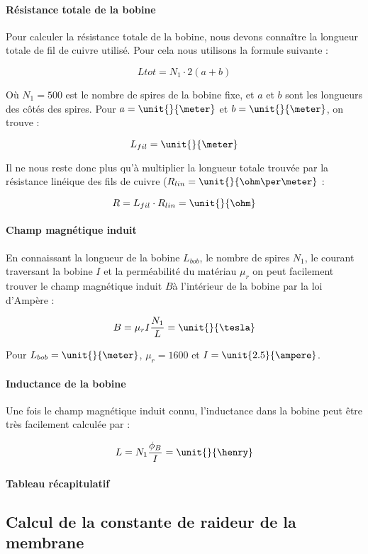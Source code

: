 \paragraph{Résistance totale de la bobine}
Pour calculer la résistance totale de la bobine, nous devons connaître la longueur totale de fil de cuivre utilisé.
Pour cela nous utilisons la formule suivante :

$$L{tot} = N_1 \cdot 2(a + b)$$

Où $N_1 = 500$ est le nombre de spires de la bobine fixe, et $a$ et $b$ sont les longueurs des côtés des spires. Pour
$a = \unit{}{\meter}$ et $b = \unit{}{\meter}$, on trouve :

$$L_{fil} = \unit{}{\meter}$$

Il ne nous reste donc plus qu'à multiplier la longueur totale trouvée par la résistance linéique des fils de cuivre
($R_{lin} = \unit{}{\ohm\per\meter}$ :

$$R = L_{fil} \cdot R_{lin} = \unit{}{\ohm}$$

\paragraph{Champ magnétique induit}
En connaissant la longueur de la bobine $L_{bob}$, le nombre de spires $N_1$, le courant traversant la bobine $I$ et
la perméabilité du matériau $\mu_r$ on peut facilement trouver le champ magnétique induit $B $à l'intérieur de la bobine 
par la loi d'Ampère :

$$B = \mu_rI \frac{N_1}{L} = \unit{}{\tesla}$$

Pour $L_{bob} = \unit{}{\meter}$, $\mu_r = 1600$ et $I = \unit{2.5}{\ampere}$.

\paragraph{Inductance de la bobine}
Une fois le champ magnétique induit connu, l'inductance dans la bobine peut être très facilement calculée par :

$$L = N_1 \frac{\phi_B}{I} = \unit{}{\henry}$$

\paragraph{Tableau récapitulatif}

\subsection{Calcul de la constante de raideur de la membrane}

